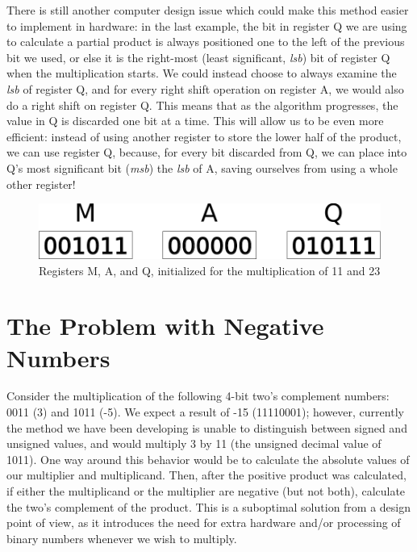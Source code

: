 \documentclass{article}
\begin{document}
There is still another computer design issue which could make this method easier to implement in hardware: in the last example, the bit in register Q we are using to calculate a partial product is always positioned one to the left of the previous bit we used, or else it is the right-most (least significant, \emph{lsb}) bit of register Q when the multiplication starts.
We could instead choose to always examine the \emph{lsb} of register Q, and for every right shift operation on register A, we would also do a right shift on register Q.
This means that as the algorithm progresses, the value in Q is discarded one bit at a time.%
This will allow us to be even more efficient: instead of using another register to store the lower half of the product, we can use register Q, because, for every bit discarded from Q, we can place into Q's most significant bit (\emph{msb}) the \emph{lsb} of A, saving ourselves from using a whole other register!

\begin{figure}[h]
\centering
\includegraphics[scale=0.4]{init.pdf}
\caption{Registers M, A, and Q, initialized for the multiplication of 11 and 23}
\end{figure}%

\pagebreak

\section{The Problem with Negative Numbers}
Consider the multiplication of the following 4-bit two's complement numbers: 0011 (3) and 1011 (-5).
We expect a result of -15 (11110001); however, currently the method we have been developing is unable to distinguish between signed and unsigned values, and would multiply 3 by 11 (the unsigned decimal value of 1011).
One way around this behavior would be to calculate the absolute values of our multiplier and multiplicand.
Then, after the positive product was calculated, if either the multiplicand or the multiplier are negative (but not both), calculate the two's complement of the product.
This is a suboptimal solution from a design point of view, as it introduces the need for extra hardware and/or processing of binary numbers whenever we wish to multiply.
\end{document}
